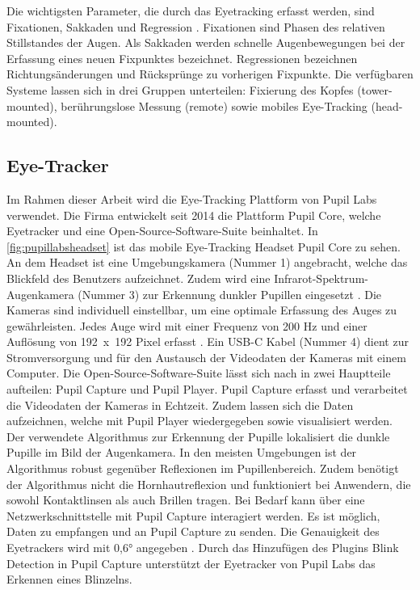 Die wichtigsten Parameter, die durch das Eyetracking erfasst werden, sind Fixationen, Sakkaden und Regression \cite{BartlPokorny.2013}. \glqq Fixationen sind Phasen des relativen Stillstandes der Augen.\grqq \cite{Blake.2013} Als Sakkaden werden schnelle Augenbewegungen bei der Erfassung eines neuen Fixpunktes bezeichnet. Regressionen bezeichnen Richtungsänderungen und Rücksprünge zu vorherigen Fixpunkte. Die verfügbaren Systeme lassen sich in drei Gruppen unterteilen: Fixierung des Kopfes (tower-mounted), berührungslose Messung (remote) sowie mobiles Eye-Tracking (head-mounted). \cite{BartlPokorny.2013}

\subsection{Eye-Tracker}
Im Rahmen dieser Arbeit wird die Eye-Tracking Plattform von Pupil Labs verwendet. Die Firma entwickelt seit 2014 die Plattform Pupil Core, welche Eyetracker und eine Open-Source-Software-Suite beinhaltet. In \autoref{fig:pupillabsheadset} ist das mobile Eye-Tracking Headset Pupil Core zu sehen. An dem Headset ist eine Umgebungskamera (Nummer 1) angebracht, welche das Blickfeld des Benutzers aufzeichnet. Zudem wird eine Infrarot-Spektrum-Augenkamera (Nummer 3) zur Erkennung dunkler Pupillen eingesetzt \cite{Kassner_2014}. Die Kameras sind individuell einstellbar, um eine optimale Erfassung des Auges zu gewährleisten. Jedes Auge wird mit einer Frequenz von 200 Hz und einer Auflösung von \mbox{192 x 192} Pixel erfasst \cite{PupilLabsSpec}. Ein USB-C Kabel (Nummer 4) dient zur Stromversorgung und für den Austausch der Videodaten der Kameras mit einem Computer. Die Open-Source-Software-Suite lässt sich nach \citeauthor{Kassner_2014} in zwei Hauptteile aufteilen: Pupil Capture und Pupil Player. Pupil Capture erfasst und verarbeitet die Videodaten der Kameras in Echtzeit. Zudem lassen sich die Daten aufzeichnen, welche mit Pupil Player wiedergegeben sowie visualisiert werden. Der verwendete Algorithmus zur Erkennung der Pupille lokalisiert die dunkle Pupille im Bild der Augenkamera. In den meisten Umgebungen ist der Algorithmus robust gegenüber Reflexionen im Pupillenbereich. Zudem benötigt der Algorithmus nicht die Hornhautreflexion und funktioniert bei Anwendern, die sowohl Kontaktlinsen als auch Brillen tragen. \cite{Kassner_2014} Bei Bedarf kann über eine Netzwerkschnittstelle mit Pupil Capture interagiert werden. Es ist möglich, Daten zu empfangen und an Pupil Capture zu senden. \cite{PupilLabsNet} Die Genauigkeit des Eyetrackers wird mit 0,6° angegeben \cite{PupilLabsSpec}. Durch das Hinzufügen des Plugins \glqq Blink Detection\grqq{} in Pupil Capture unterstützt der Eyetracker von Pupil Labs das Erkennen eines Blinzelns. \cite{PupilCapture.2020}

